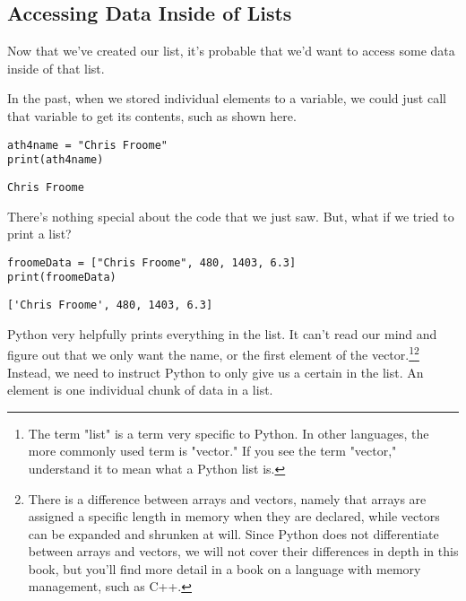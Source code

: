 \subsection{Accessing Data Inside of Lists}
Now that we've created our list, it's probable that we'd want to access some data inside of that list.\par
In the past, when we stored individual elements to a variable, we could just call that variable to get its contents, such as shown here.
\begin{lstlisting}[style=pippython]
ath4name = "Chris Froome"
print(ath4name)
\end{lstlisting}
\begin{lstlisting}[style=none]
Chris Froome
\end{lstlisting}
There's nothing special about the code that we just saw. But, what if we tried to print a list?\par
\begin{lstlisting}[style=pippython]
froomeData = ["Chris Froome", 480, 1403, 6.3]
print(froomeData)
\end{lstlisting}
\begin{lstlisting}[style=none]
['Chris Froome', 480, 1403, 6.3]
\end{lstlisting}
Python very helpfully prints everything in the list. It can't read our mind and figure out that we only want the name, or the first element of the vector.\footnote{The term "list" is a term very specific to Python. In other languages, the more commonly used term is "vector." If you see the term "vector," understand it to mean what a Python list is.}\footnote{There is a difference between arrays and vectors, namely that arrays are assigned a specific length in memory when they are declared, while vectors can be expanded and shrunken at will. Since Python does not differentiate between arrays and vectors, we will not cover their differences in depth in this book, but you'll find more detail in a book on a language with memory management, such as C++.} Instead, we need to instruct Python to only give us a certain  in the list. An element is one individual chunk of data in a list.\par
{}\par
